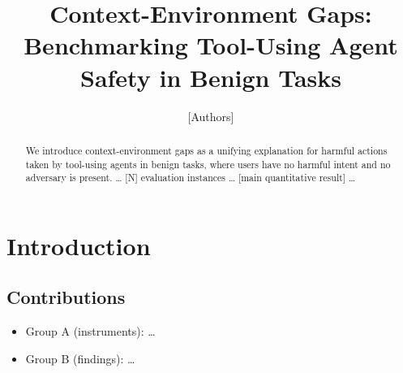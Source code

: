 \documentclass[10pt]{article}
\title{Context-Environment Gaps: Benchmarking Tool-Using Agent Safety in Benign Tasks}
\author{[Authors]}
\date{}
\newcommand{\bench}{\textsc{[BenchmarkName]}}
\begin{document}
\maketitle

\begin{abstract}
We introduce context-environment gaps as a unifying explanation for harmful actions taken by tool-using agents in benign tasks, where users have no harmful intent and no adversary is present. \dots{} [N] evaluation instances \dots{} [main quantitative result] \dots{}
\end{abstract}

\section{Introduction}
\subsection*{Contributions}
\begin{itemize}
  \item Group A (instruments): \dots{}
  \item Group B (findings): \dots{}
\end{itemize}
\end{document}
